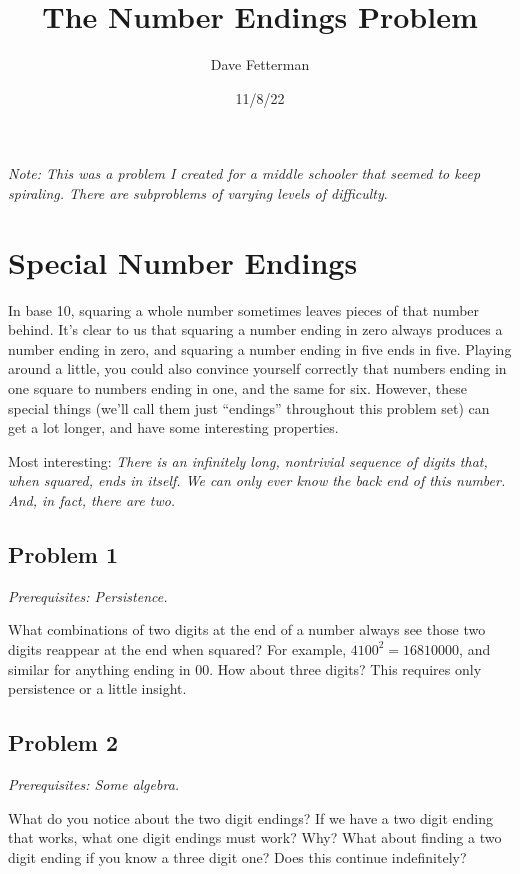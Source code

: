 \documentclass[11pt, oneside]{article} 	%
\title{The Number Endings Problem}
\author{Dave Fetterman}
\affil{Obviously Unemployed}
\date{11/8/22}
\begin{document}
\maketitle

\emph{Note: This was a problem I created for a middle schooler that seemed to keep spiraling. There are subproblems of varying levels of difficulty}.

\section{Special Number Endings}

In base 10, squaring a whole number sometimes leaves pieces of that number behind.  It's clear to us that squaring a number ending in zero always produces a number ending in zero, and squaring a number ending in five ends in five.  Playing around a little, you could also convince yourself correctly that numbers ending in one square to numbers ending in one, and the same for six.  However, these special things (we'll call them just ``endings'' throughout this problem set) can get a lot longer, and have some interesting properties.

Most interesting: \emph{There is an infinitely long, nontrivial sequence of digits that, when squared, ends in itself.  We can only ever know the back end of this number.  And, in fact, there are two.}

\subsection{Problem 1} 

\emph{Prerequisites: Persistence.}

What combinations of two digits at the end of a number always see those two digits reappear at the end when squared?  For example, $4100^2 = 16810000$, and similar for anything ending in 00.  How about three digits? This requires only persistence or a little insight.

\subsection{Problem 2} 

\emph{Prerequisites: Some algebra.}

What do you notice about the two digit endings?  If we have a two digit ending that works, what one digit endings must work?  Why?  What about finding a two digit ending if you know a three digit one?  Does this continue indefinitely?
\end{document}
